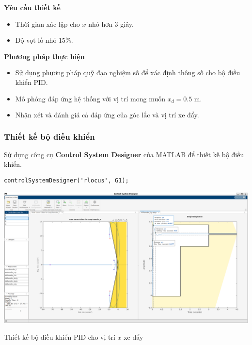 \documentclass[12pt,a4paper]{article}
\begin{document}
\vspace{\baselineskip}

\begin{minipage}[t]{0.3\linewidth}
    \textbf{Yêu cầu thiết kế}
\end{minipage}\begin{minipage}[t]{0.6\linewidth}
    \begin{itemize}[noitemsep,topsep=0pt]
        \item Thời gian xác lập cho $x$ nhỏ hơn 3 giây.
        \item Độ vọt lố nhỏ 15\%.
    \end{itemize}
\end{minipage}

\vspace{\baselineskip}

\begin{minipage}[t]{0.3\linewidth}
    \textbf{Phương pháp thực hiện}
\end{minipage}\begin{minipage}[t]{0.6\linewidth}
    \begin{itemize}[noitemsep,topsep=0pt]
        \item Sử dụng phương pháp quỹ đạo nghiệm số để xác định thông số cho bộ điều khiển PID.
        \item Mô phỏng đáp ứng hệ thống với vị trí mong muốn $x_d = 0.5$ m.
        \item Nhận xét và đánh giá cả đáp ứng của góc lắc và vị trí xe đẩy.
    \end{itemize}
\end{minipage}

\subsubsection{Thiết kế bộ điều khiển}

Sử dụng công cụ \textbf{Control System Designer} của MATLAB để thiết kế bộ điều khiển. 
\begin{lstlisting}[style=matlabstyle,caption=Thiết kế bộ điều khiển PID cho hàm truyền $G_2(s)$]
controlSystemDesigner('rlocus', G1);
\end{lstlisting}


\begin{center}
    \captionsetup{type=figure}
    \includegraphics[width=\linewidth]{thiet_ke_PID_xe_day.png}
    \caption{Thiết kế bộ điều khiển PID cho vị trí $x$ xe đẩy}
\end{center}
\end{document}
